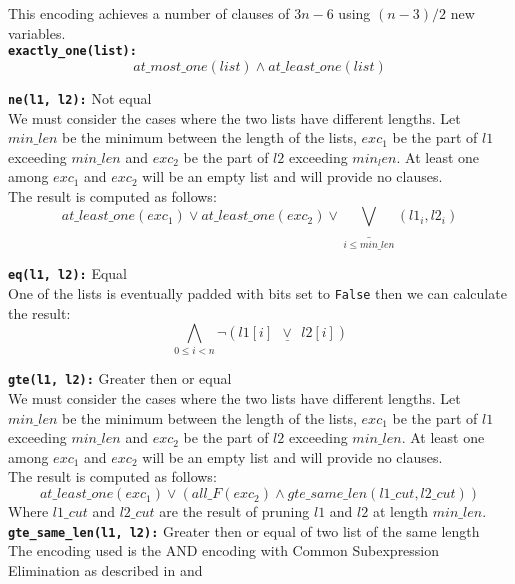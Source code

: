 This encoding achieves a number of clauses of $3n - 6$ using $(n-3)/2$ new variables.
\\

\texttt{\textbf{exactly\_one(list):}}
\begin{equation}
    at\_most\_one(list) \wedge at\_least\_one(list)
\end{equation}


\texttt{\textbf{ne(l1, l2):}} Not equal\\
We must consider the cases where the two lists have different lengths.
Let $min\_len$ be the minimum between the length of the lists, $exc_1$ be the part of $l1$
 exceeding $min\_len$ and $exc_2$ be the part of $l2$ exceeding $min_len$. At least one 
among $exc_1$ and $exc_2$ will be an empty list and will provide no clauses.\\
The result is computed as follows:
\begin{equation}
    at\_least\_one(exc_1) \vee at\_least\_one(exc_2) \vee \underline{\bigvee}\limits_{i \leq min\_len}(l1_i, l2_i)
\end{equation}

\texttt{\textbf{eq(l1, l2):}} Equal\\
One of the lists is eventually padded with bits set to \texttt{False} then we can
calculate the result:
\begin{equation}
    \bigwedge\limits_{0 \leq i < n} \neg (l1[i]      \ \ \underline\vee\ \ l2[i] )
\end{equation}


\texttt{\textbf{gte(l1, l2):}} Greater then or equal\\
We must consider the cases where the two lists have different lengths.
Let $min\_len$ be the minimum between the length of the lists, $exc_1$ be the part of $l1$ 
exceeding $min\_len$ and $exc_2$ be the part of $l2$ exceeding $min\_len$. At least one among
$exc_1$ and $exc_2$ will be an empty list and will provide no clauses.\\
The result is computed as follows:
\begin{equation}
    at\_least\_one(exc_1) \vee ( all\_F(exc_2) \wedge gte\_same\_len(l1\_cut, l2\_cut))
\end{equation}
Where $l1\_cut$ and $l2\_cut$ are the result of pruning $l1$ and $l2$ at length $min\_len$.\\

\texttt{\textbf{gte\_same\_len(l1, l2):}} Greater then or equal of two list of the same length\\
The encoding used is the AND encoding with Common Subexpression Elimination as described in 
\cite{Elgabou} and \cite{Zhao}\\

